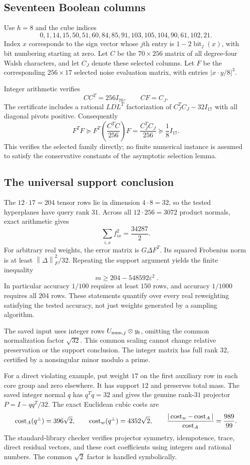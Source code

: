 \documentclass[11pt]{article}
\theoremstyle{remark}\newtheorem{remark}[theorem]{Remark}
\newcommand{\eps}{\varepsilon}\newcommand{\norm}[1]{\left\|#1\right\|}
\begin{document}
\subsection{Seventeen Boolean columns}
Use $h=8$ and the cube indices
\[
 0,1,14,15,50,51,60,84,85,91,103,105,104,90,61,102,21.
\]
Index $x$ corresponds to the sign vector whose $j$th entry is $1-2\operatorname{bit}_j(x)$, with bit numbering starting at zero. Let $C$ be the $70\times256$ matrix of all degree-four Walsh characters, and let $C_J$ denote these selected columns. Let $F$ be the corresponding $256\times17$ selected noise evaluation matrix, with entries $|x\cdot y/8|^3$.

Integer arithmetic verifies
\[
 CC^T=256I_{70},\qquad CF=C_J.
\]
The certificate includes a rational $LDL^T$ factorization of $C_J^TC_J-32I_{17}$ with all diagonal pivots positive. Consequently
\[
 F^TF\succeq F^T\left(\frac{C^TC}{256}\right)F
 =\frac{C_J^TC_J}{256}\succeq\frac18I_{17}.
\]
This verifies the selected family directly; no finite numerical instance is assumed to satisfy the conservative constants of the asymptotic selection lemma.

\subsection{The universal support conclusion}
The $12\cdot17=204$ tensor rows lie in dimension $4\cdot8=32$, so the tested hyperplanes have query rank $31$. Across all $12\cdot256=3072$ product normals, exact arithmetic gives
\[
 \sum_{i,x} f_{ix}^2=\frac{34287}{2}.
\]
For arbitrary real weights, the error matrix is $G\Delta F^T$. Its squared Frobenius norm is at least $\norm\Delta_F^2/32$. Repeating the support argument yields the finite inequality
\begin{equation}\label{eq:exactbound}
 \boxed{\ m\ge204-548592\eps^2\ }.
\end{equation}
In particular accuracy $1/100$ requires at least $150$ rows, and accuracy $1/1000$ requires all $204$ rows. These statements quantify over every real reweighting satisfying the tested accuracy, not just weights generated by a sampling algorithm.

The saved input uses integer rows $U_{{\rm num},j}\otimes y_t$, omitting the common normalization factor $\sqrt{32}$. This common scaling cannot change relative preservation or the support conclusion. The integer matrix has full rank $32$, certified by a nonsingular minor modulo a prime.

For a direct violating example, put weight $17$ on the first auxiliary row in each core group and zero elsewhere. It has support $12$ and preserves total mass. The saved integer normal $q$ has $q^Tq=32$ and gives the genuine rank-$31$ projector $P=I-qq^T/32$. The exact Euclidean cubic costs are
\[
 \operatorname{cost}_A(q^\perp)=396\sqrt2,\qquad
 \operatorname{cost}_w(q^\perp)=4352\sqrt2,\qquad
 \frac{|\operatorname{cost}_w-\operatorname{cost}_A|}{\operatorname{cost}_A}=\frac{989}{99}.
\]
The standard-library checker verifies projector symmetry, idempotence, trace, direct residual vectors, and these cost coefficients using integers and rational numbers. The common $\sqrt2$ factor is handled symbolically.
\end{document}
